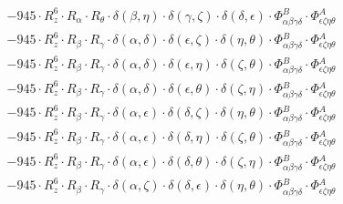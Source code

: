 \documentclass{article}
\begin{document}
\begin{equation}
\begin{array}{c}
 \\[0.2em] 		 - 945 \cdot R_{z}^{6} \cdot R_{\alpha{}} \cdot R_{\theta{}} \cdot \delta{}\left(\beta{}, \eta{}\right) \cdot \delta{}\left(\gamma{}, \zeta{}\right) \cdot \delta{}\left(\delta{}, \epsilon{}\right) \cdot \Phi{}^{B}_{\alpha{}\beta{}\gamma{}\delta{}} \cdot \Phi{}^{A}_{\epsilon{}\zeta{}\eta{}\theta{}} 
 \\[0.2em] 		 - 945 \cdot R_{z}^{6} \cdot R_{\beta{}} \cdot R_{\gamma{}} \cdot \delta{}\left(\alpha{}, \delta{}\right) \cdot \delta{}\left(\epsilon{}, \zeta{}\right) \cdot \delta{}\left(\eta{}, \theta{}\right) \cdot \Phi{}^{B}_{\alpha{}\beta{}\gamma{}\delta{}} \cdot \Phi{}^{A}_{\epsilon{}\zeta{}\eta{}\theta{}} 
 \\[0.2em] 		 - 945 \cdot R_{z}^{6} \cdot R_{\beta{}} \cdot R_{\gamma{}} \cdot \delta{}\left(\alpha{}, \delta{}\right) \cdot \delta{}\left(\epsilon{}, \eta{}\right) \cdot \delta{}\left(\zeta{}, \theta{}\right) \cdot \Phi{}^{B}_{\alpha{}\beta{}\gamma{}\delta{}} \cdot \Phi{}^{A}_{\epsilon{}\zeta{}\eta{}\theta{}} 
 \\[0.2em] 		 - 945 \cdot R_{z}^{6} \cdot R_{\beta{}} \cdot R_{\gamma{}} \cdot \delta{}\left(\alpha{}, \delta{}\right) \cdot \delta{}\left(\epsilon{}, \theta{}\right) \cdot \delta{}\left(\zeta{}, \eta{}\right) \cdot \Phi{}^{B}_{\alpha{}\beta{}\gamma{}\delta{}} \cdot \Phi{}^{A}_{\epsilon{}\zeta{}\eta{}\theta{}} 
 \\[0.2em] 		 - 945 \cdot R_{z}^{6} \cdot R_{\beta{}} \cdot R_{\gamma{}} \cdot \delta{}\left(\alpha{}, \epsilon{}\right) \cdot \delta{}\left(\delta{}, \zeta{}\right) \cdot \delta{}\left(\eta{}, \theta{}\right) \cdot \Phi{}^{B}_{\alpha{}\beta{}\gamma{}\delta{}} \cdot \Phi{}^{A}_{\epsilon{}\zeta{}\eta{}\theta{}} 
 \\[0.2em] 		 - 945 \cdot R_{z}^{6} \cdot R_{\beta{}} \cdot R_{\gamma{}} \cdot \delta{}\left(\alpha{}, \epsilon{}\right) \cdot \delta{}\left(\delta{}, \eta{}\right) \cdot \delta{}\left(\zeta{}, \theta{}\right) \cdot \Phi{}^{B}_{\alpha{}\beta{}\gamma{}\delta{}} \cdot \Phi{}^{A}_{\epsilon{}\zeta{}\eta{}\theta{}} 
 \\[0.2em] 		 - 945 \cdot R_{z}^{6} \cdot R_{\beta{}} \cdot R_{\gamma{}} \cdot \delta{}\left(\alpha{}, \epsilon{}\right) \cdot \delta{}\left(\delta{}, \theta{}\right) \cdot \delta{}\left(\zeta{}, \eta{}\right) \cdot \Phi{}^{B}_{\alpha{}\beta{}\gamma{}\delta{}} \cdot \Phi{}^{A}_{\epsilon{}\zeta{}\eta{}\theta{}} 
 \\[0.2em] 		 - 945 \cdot R_{z}^{6} \cdot R_{\beta{}} \cdot R_{\gamma{}} \cdot \delta{}\left(\alpha{}, \zeta{}\right) \cdot \delta{}\left(\delta{}, \epsilon{}\right) \cdot \delta{}\left(\eta{}, \theta{}\right) \cdot \Phi{}^{B}_{\alpha{}\beta{}\gamma{}\delta{}} \cdot \Phi{}^{A}_{\epsilon{}\zeta{}\eta{}\theta{}} 

\end{array}
\end{equation}
\end{document}
